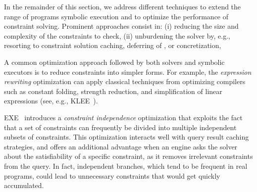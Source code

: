 In the remainder of this section, we address different techniques to extend the range of programs  symbolic execution and to optimize the performance of constraint solving. Prominent approaches consist in: (i) reducing the size and complexity of the constraints to check, (ii) unburdening the solver by, e.g., resorting to constraint solution caching, deferring of , or concretization, 




A common optimization approach followed by both solvers and symbolic executors is to reduce constraints into simpler forms. For example, the {\em expression rewriting} optimization can apply classical techniques from optimizing compilers such as constant folding, strength reduction, and simplification of linear expressions (see, e.g., {\sc KLEE}~\cite{KLEE-OSDI08}).

{\sc EXE}~\cite{EXE-CCS06} introduces a {\em constraint independence} optimization that exploits the fact that a set of constraints can frequently be divided into multiple independent subsets of constraints. This optimization interacts well with query result caching strategies, and offers an additional advantage when an engine asks the solver about the satisfiability of a specific constraint, as it removes irrelevant constraints from the query. In fact, independent branches, which tend to be frequent in real programs, could lead to unnecessary constraints that would get quickly accumulated.

